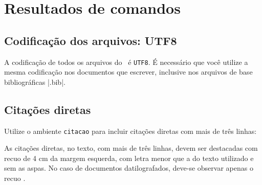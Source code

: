 
 
\chapter{Resultados de comandos}\label{cap_exemplos}


\section{Codificação dos arquivos: UTF8}

A codificação de todos os arquivos do \abnTeX\ é \texttt{UTF8}. É necessário que
você utilize a mesma codificação nos documentos que escrever, inclusive nos
arquivos de base bibliográficas |.bib|.

\section{Citações diretas}
\label{sec-citacao}

Utilize o ambiente \texttt{citacao} para incluir
citações diretas com mais de três linhas:

\begin{citacao}
As citações diretas, no texto, com mais de três linhas, devem ser
destacadas com recuo de 4 cm da margem esquerda, com letra menor que a do texto
utilizado e sem as aspas. No caso de documentos datilografados, deve-se
observar apenas o recuo \cite[5.3]{NBR10520:2002}.
\end{citacao}

